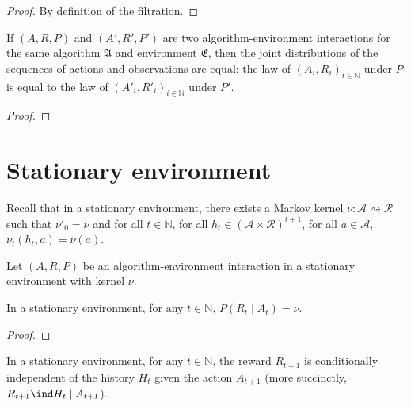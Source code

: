 \begin{proof}\leanok
By definition of the filtration.
\end{proof}


\begin{theorem}\label{thm:isAlgEnvSeq_unique}
  \leanok
If $(A, R, P)$ and $(A', R', P')$ are two algorithm-environment interactions for the same algorithm $\mathfrak{A}$ and environment $\mathfrak{E}$, then the joint distributions of the sequences of actions and observations are equal: the law of $(A_i, R_i)_{i \in \mathbb{N}}$ under $P$ is equal to the law of $(A'_i, R'_i)_{i \in \mathbb{N}}$ under $P'$.
\end{theorem}

\begin{proof}\leanok

\end{proof}



\section{Stationary environment}

Recall that in a stationary environment, there exists a Markov kernel $\nu : \mathcal{A} \rightsquigarrow \mathcal{R}$ such that $\nu'_0 = \nu$ and for all $t \in \mathbb{N}$, for all $h_t \in (\mathcal{A} \times \mathcal{R})^{t+1}$, for all $a \in \mathcal{A}$, $\nu_t(h_t, a) = \nu(a)$.

Let $(A, R, P)$ be an algorithm-environment interaction in a stationary environment with kernel $\nu$.

\begin{lemma}\label{lem:condDistrib_reward_stationaryEnv}
  \leanok
In a stationary environment, for any $t \in \mathbb{N}$, $P\left(R_t \mid A_t\right) = \nu$.
\end{lemma}

\begin{proof}\leanok

\end{proof}


\begin{lemma}\label{lem:condIndepFun_reward_hist_action}
  \leanok
In a stationary environment, for any $t \in \mathbb{N}$, the reward $R_{t+1}$ is conditionally independent of the history $H_t$ given the action $A_{t+1}$ (more succinctly, $R_{t+1} \ind H_t \mid A_{t+1}$).
\end{lemma}

